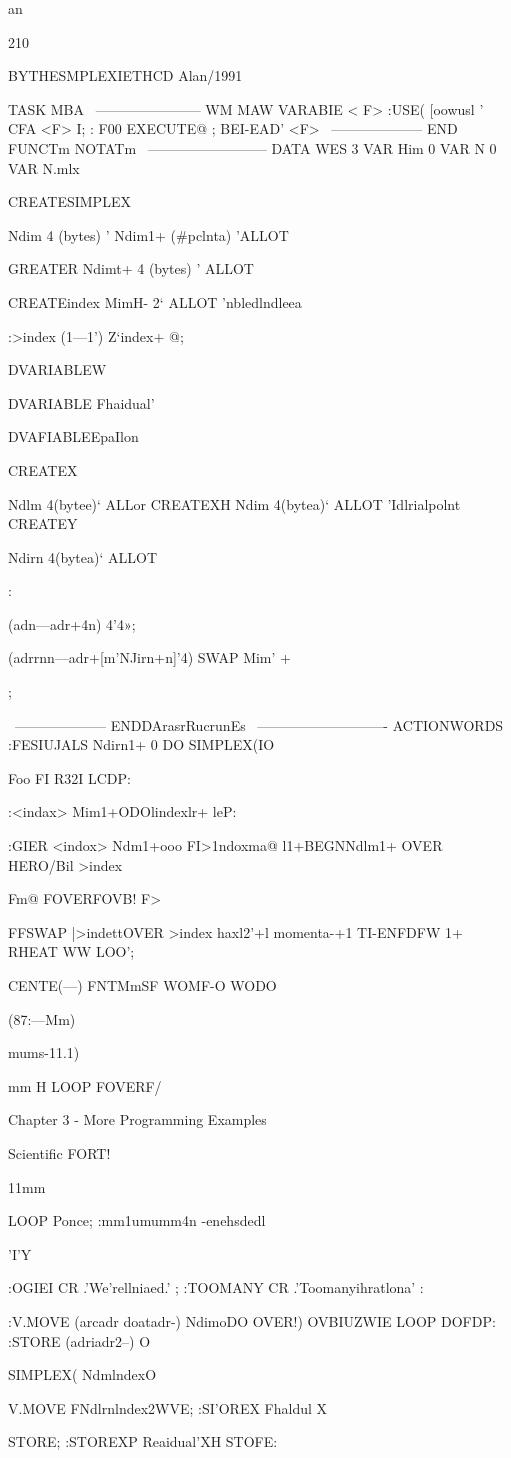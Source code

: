 {{{{{{{an

210

\WIIZATW BYTHESMPLEXIETHCD
\mmmstw Alan/1991

TASK MBA
\ ----------------------- WM MAW
VARABIE < F>
:USE( [oowusl ' CFA <F> I;
: F00 EXECUTE@ ;
BEI-EAD' <F>
\ -------------------- END FUNCTm NOTATm
\ -------------------------- DATA WES
3 VAR Him
0 VAR N
0 VAR N.mlx

CREATESIMPLEX{{ Ndim 4 (bytes) ' Ndim1+ (#pclnta)
'ALLOT

GREATER Ndimt+ 4 (bytes) ' ALLOT \nelduale

CREATEindex MimH- 2‘ ALLOT \arruyloraem'nbledlndleea

:>index (1—1') Z‘index+ @;

DVARIABLEW

DVARIABLE Fhaidual'

DVAFIABLEEpaIlon

CREATEX{ Ndlm 4(bytee)‘ ALLor \trialpoint
CREATEXH Ndim 4(bytea)‘ ALLOT \Z'Idlrialpolnt
CREATEY{ Ndirn 4(bytea)‘ ALLOT \geocenter

:} (adn—adr+4n) 4'4»; }} (adrrnn—adr+[m'NJirn+n]'4) SWAP Mim' + };

\ -------------------- ENDDArasrRucrunEs
\ ---------------------------- ACTIONWORDS
:FESIUJALS
Ndirn1+ 0 DO SIMPLEX{(IO}} Foo F{I} R32I
LCDP:

:<indax> Mim1+ODOlindexlr+ leP: 

:GIER <indox>
Ndm1+ooo F{I>1ndox}ma@
l1+BEGNNdlm1+ OVER
HERO/Bil >index}Fm@ FOVERFOVB! F>

FFSWAP
|>indettOVER >index
haxl2'+l momenta-+1
TI-ENFDFW 1+
RHEAT WW
LOO’;

CENTE(—) FNTMmSF
WOMF-O
WODO

(87:—Mm)
\Ioepwereomponents
\uraoeoverm

mums-11.1)} mm H
LOOP FOVERF/

Chapter 3 - More Programming Examples

 

Scientiﬁc FORT!

11mm

LOOP Ponce;
\m:mm1umumm4n
\--enehsdedl

\WII'I'Y

:OGIEI CR .'We'rellniaed.' ;
:TOOMANY CR .'Toomanyihratlona' :

:V.MOVE (arcadr doatadr-) \rnovevemr
NdimoDO OVER!) OVBIUZWIE
LOOP DOFDP:
:STORE (adriadr2--) O}
SIMPLEX({ NdmlndexO}}V.MOVE
F{Ndlrnlndex}2WVE;
:SI'OREX Fhaldul X{ STORE;
:STOREXP Reaidual'XH STOFE:

}}}
